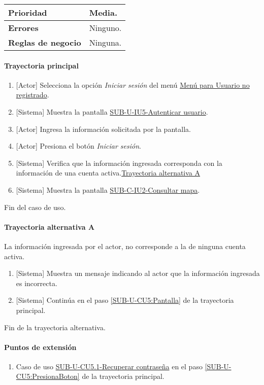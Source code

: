 \begin{longtable}{|J{5cm}|J{10.3cm}|}
		\\ \hline 
	\textbf{Prioridad} & 
		Media. \\ \hline
	\textbf{Errores} & Ninguno.
		\\ \hline
	\textbf{Reglas de negocio} & Ninguna.
		 \\ \hline
\end{longtable}

\paragraph{Trayectoria principal}
	\begin{enumerate}
		\item {[Actor]} Selecciona la opción \textit{Iniciar sesión} del menú \hyperref[fig:menu-usuario]{Menú para Usuario no registrado}.
		\item \label{SUB-U-CU5:Pantalla} {[Sistema]} Muestra la pantalla \hyperref[fig:sub-u-iu5]{SUB-U-IU5-Autenticar usuario}.
		\item {[Actor]} Ingresa la información solicitada por la pantalla.
		\item \label{SUB-U-CU5:PresionaBoton} {[Actor]} Presiona el botón \textit{Iniciar sesión}.
		\item {[Sistema]} Verifica que la información ingresada corresponda con la información de una cuenta activa.\hyperref[SUB-U-CU5:TA]{Trayectoria alternativa A}
		\item \label{SUB-U-CU5:Pantalla} {[Sistema]} Muestra la pantalla \hyperref[fig:sub-c-iu2]{SUB-C-IU2-Consultar mapa}.
	\end{enumerate}
	Fin del caso de uso.

\paragraph{Trayectoria alternativa A} \label{SUB-U-CU5:TA}
	La información ingresada por el actor, no corresponde a la de ninguna cuenta activa.
	\begin{enumerate}[label=A\arabic*.]
		\item {[Sistema]} Muestra un mensaje indicando al actor que la información ingresada es incorrecta.
		\item {[Sistema]} Continúa en el paso \ref{SUB-U-CU5:Pantalla} de la trayectoria principal.
	\end{enumerate}
	Fin de la trayectoria alternativa.

\paragraph{Puntos de extensión} \label{SUB-U-CU5:PE}
\begin{enumerate}[label=PE\arabic*.]
	\item Caso de uso \hyperref[SUB-U-CU5.1]{SUB-U-CU5.1-Recuperar contraseña} en el paso \ref{SUB-U-CU5:PresionaBoton} de la trayectoria principal.
\end{enumerate}
